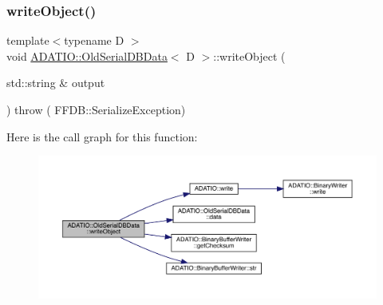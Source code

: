 \mbox{\label{classADATIO_1_1OldSerialDBData_aec52af4bfb6beb74fc039b9b25328270}} 
\subsubsection{\texorpdfstring{writeObject()}{writeObject()}\hspace{0.1cm}{\footnotesize\ttfamily [1/2]}}
{\footnotesize\ttfamily template$<$typename D $>$ \\
void \mbox{\hyperlink{classADATIO_1_1OldSerialDBData}{A\+D\+A\+T\+I\+O\+::\+Old\+Serial\+D\+B\+Data}}$<$ D $>$\+::write\+Object (\begin{DoxyParamCaption}\item[{std\+::string \&}]{output }\end{DoxyParamCaption}) throw ( F\+F\+D\+B\+::\+Serialize\+Exception) \hspace{0.3cm}{\ttfamily [inline]}}

Here is the call graph for this function\+:
\nopagebreak
\begin{figure}[H]
\begin{center}
\leavevmode
\includegraphics[width=350pt]{da/dbc/classADATIO_1_1OldSerialDBData_aec52af4bfb6beb74fc039b9b25328270_cgraph}
\end{center}
\end{figure}
\mbox{\label{classADATIO_1_1OldSerialDBData_aec52af4bfb6beb74fc039b9b25328270}} 
